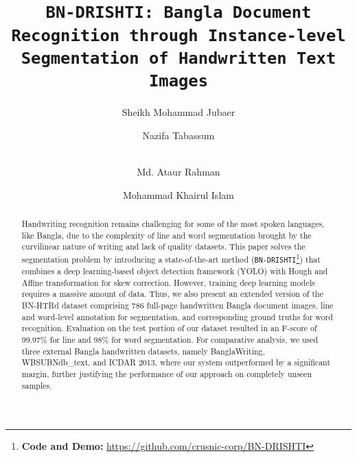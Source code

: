\documentclass[runningheads]{llncs}
\begin{document}
\title{\texttt{BN-DRISHTI: Bangla Document Recognition through Instance-level Segmentation of Handwritten Text Images}}



\author{Sheikh Mohammad Jubaer \and
Nazifa Tabassum \and \\
Md. Ataur Rahman \and 
Mohammad Khairul Islam}


\maketitle         


\begin{abstract}
Handwriting recognition remains challenging for some of the most spoken languages, like Bangla, due to the complexity of line and word segmentation brought by the curvilinear nature of writing and lack of quality datasets. This paper solves the segmentation problem by introducing a state-of-the-art method (\texttt{BN-DRISHTI}\footnote{\textbf{Code and Demo:} \url{https://github.com/crusnic-corp/BN-DRISHTI}}) that combines a deep learning-based object detection framework (YOLO) with Hough and Affine transformation for skew correction. However, training deep learning models requires a massive amount of data. Thus, we also present an extended version of the BN-HTRd dataset comprising 786 full-page handwritten Bangla document images, line and word-level annotation for segmentation, and corresponding ground truths for word recognition. Evaluation on the test portion of our dataset resulted in an F-score of $99.97\%$ for line and $98\%$ for word segmentation. For comparative analysis, we used three external Bangla handwritten datasets, namely BanglaWriting, WBSUBNdb\_text, and ICDAR 2013, where our system outperformed by a significant margin, further justifying the performance of our approach on completely unseen samples.



\end{abstract}
\end{document}
